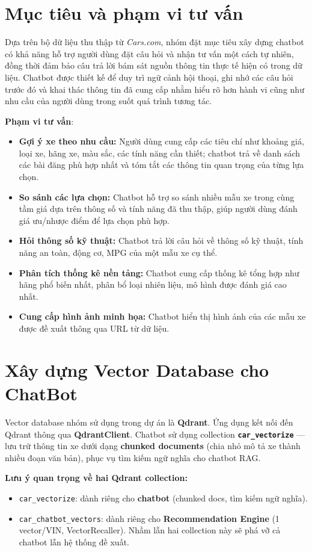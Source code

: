 \section{Mục tiêu và phạm vi tư vấn}
Dựa trên bộ dữ liệu thu thập từ \textit{Cars.com}, nhóm đặt mục tiêu xây dựng chatbot có khả năng hỗ trợ người dùng đặt câu hỏi và nhận tư vấn một cách tự nhiên, đồng thời đảm bảo câu trả lời bám sát nguồn thông tin thực tế hiện có trong dữ liệu. Chatbot được thiết kế để duy trì ngữ cảnh hội thoại, ghi nhớ các câu hỏi trước đó và khai thác thông tin đã cung cấp nhằm hiểu rõ hơn hành vi cũng như nhu cầu của người dùng trong suốt quá trình tương tác.

\noindent \textbf{Phạm vi tư vấn}:
\begin{itemize}
    \item \textbf{Gợi ý xe theo nhu cầu:} Người dùng cung cấp các tiêu chí như khoảng giá, loại xe, hãng xe, màu sắc, các tính năng cần thiết; chatbot trả về danh sách các bài đăng phù hợp nhất và tóm tắt các thông tin quan trọng của từng lựa chọn.
    \item \textbf{So sánh các lựa chọn:} Chatbot hỗ trợ so sánh nhiều mẫu xe trong cùng tầm giá dựa trên thông số và tính năng đã thu thập, giúp người dùng đánh giá ưu/nhược điểm để lựa chọn phù hợp.
    \item \textbf{Hỏi thông số kỹ thuật:} Chatbot trả lời câu hỏi về thông số kỹ thuật, tính năng an toàn, động cơ, MPG của một mẫu xe cụ thể.
    \item \textbf{Phân tích thống kê nền tảng:} Chatbot cung cấp thống kê tổng hợp như hãng phổ biến nhất, phân bổ loại nhiên liệu, mô hình được đánh giá cao nhất.
    \item \textbf{Cung cấp hình ảnh minh họa:} Chatbot hiển thị hình ảnh của các mẫu xe được đề xuất thông qua URL từ dữ liệu.
\end{itemize}



\section{Xây dựng Vector Database cho ChatBot}
Vector database nhóm sử dụng trong dự án là \textbf{Qdrant}. Ứng dụng kết nối đến Qdrant thông qua \textbf{QdrantClient}. Chatbot sử dụng collection \texttt{\textbf{car\_vectorize}} — lưu trữ thông tin xe dưới dạng \textbf{chunked documents} (chia nhỏ mô tả xe thành nhiều đoạn văn bản), phục vụ tìm kiếm ngữ nghĩa cho chatbot RAG.

\textbf{Lưu ý quan trọng về hai Qdrant collection:}
\begin{itemize}
    \item \texttt{car\_vectorize}: dành riêng cho \textbf{chatbot} (chunked docs, tìm kiếm ngữ nghĩa).
    \item \texttt{car\_chatbot\_vectors}: dành riêng cho \textbf{Recommendation Engine} (1 vector/VIN, VectorRecaller). Nhầm lẫn hai collection này sẽ phá vỡ cả chatbot lẫn hệ thống đề xuất.
\end{itemize}

